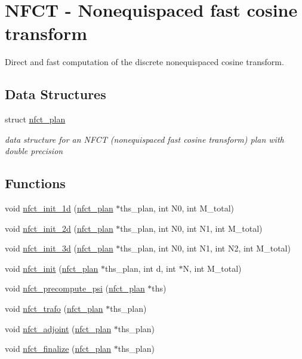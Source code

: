 \hypertarget{group__nfct}{\section{N\-F\-C\-T -\/ Nonequispaced fast cosine transform}
\label{group__nfct}
}


Direct and fast computation of the discrete nonequispaced cosine transform.  


\subsection*{Data Structures}
\begin{DoxyCompactItemize}
\item 
struct \hyperlink{structnfct__plan}{nfct\-\_\-plan}
\begin{DoxyCompactList}\small\item\em data structure for an N\-F\-C\-T (nonequispaced fast cosine transform) plan with double precision \end{DoxyCompactList}\end{DoxyCompactItemize}
\subsection*{Functions}
\begin{DoxyCompactItemize}
\item 
void \hyperlink{group__nfct_gacdaa71ef0c4ea05c55a09a08845b3043}{nfct\-\_\-init\-\_\-1d} (\hyperlink{structnfct__plan}{nfct\-\_\-plan} $\ast$ths\-\_\-plan, int N0, int M\-\_\-total)
\item 
void \hyperlink{group__nfct_ga84c8a611ea11546b90a7db424ebced7c}{nfct\-\_\-init\-\_\-2d} (\hyperlink{structnfct__plan}{nfct\-\_\-plan} $\ast$ths\-\_\-plan, int N0, int N1, int M\-\_\-total)
\item 
void \hyperlink{group__nfct_ga7894f72320bda7850ccf43b9a227fe09}{nfct\-\_\-init\-\_\-3d} (\hyperlink{structnfct__plan}{nfct\-\_\-plan} $\ast$ths\-\_\-plan, int N0, int N1, int N2, int M\-\_\-total)
\item 
void \hyperlink{group__nfct_ga69ac40972c84cfd04909723da056004b}{nfct\-\_\-init} (\hyperlink{structnfct__plan}{nfct\-\_\-plan} $\ast$ths\-\_\-plan, int d, int $\ast$N, int M\-\_\-total)
\item 
void \hyperlink{group__nfct_gadfcdf2b4ab8d47c2391ac760c307939f}{nfct\-\_\-precompute\-\_\-psi} (\hyperlink{structnfct__plan}{nfct\-\_\-plan} $\ast$ths)
\item 
void \hyperlink{group__nfct_ga73327e4f32328dcae3e9f86572a0e15a}{nfct\-\_\-trafo} (\hyperlink{structnfct__plan}{nfct\-\_\-plan} $\ast$ths\-\_\-plan)
\item 
void \hyperlink{group__nfct_gabc14753b2aa4ae8af85fc9632720514e}{nfct\-\_\-adjoint} (\hyperlink{structnfct__plan}{nfct\-\_\-plan} $\ast$ths\-\_\-plan)
\item 
void \hyperlink{group__nfct_ga5613906eb739a977bd862fbdb25224f6}{nfct\-\_\-finalize} (\hyperlink{structnfct__plan}{nfct\-\_\-plan} $\ast$ths\-\_\-plan)
\end{DoxyCompactItemize}


